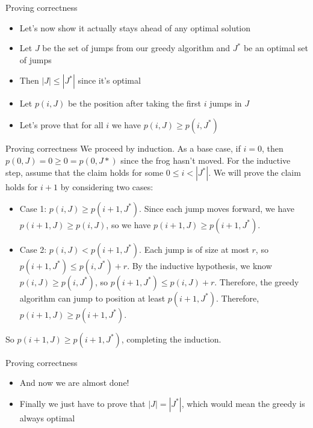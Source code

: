 \documentclass{beamer}
\begin{document}
\begin{frame}[plain]{Proving correctness}
    \begin{itemize}
        \item Let's now show it actually stays ahead of any optimal solution
        \item Let $J$ be the set of jumps from our greedy algorithm and $J^*$ be an optimal set of jumps
        \item Then $|J| \leq |J^*|$ since it's optimal
        \item Let $p(i, J)$ be the position after taking the first $i$ jumps in $J$
        \item Let's prove that for all $i$ we have $p(i, J) \geq p(i, J^*)$
    \end{itemize}
\end{frame}

\begin{frame}[plain]{Proving correctness}
We proceed by induction. 
As a base case, if $i = 0$, then
$p(0, J) = 0 \geq 0 = p(0, J*)$ since the frog hasn't moved.
For the inductive step, assume that the claim holds
for some $0 \leq i < | J^*|$. We will prove the claim holds
for $i + 1$ by considering two cases:
\begin{itemize}
\item Case 1: $p(i, J) \geq p(i + 1, J^*)$. Since each jump moves forward, 
we have $p(i + 1, J) \geq p(i, J)$, so we have $p(i + 1, J) \geq p(i + 1, J^*)$.
\item Case 2: $p(i, J) < p(i + 1, J^*)$. Each jump is of size at most $r$, 
so $p(i + 1, J^*) \leq p(i, J^*) + r$. By the inductive hypothesis, we
know $p(i, J) \geq p(i, J^*)$, so $p(i + 1, J^*) \leq p(i, J) + r$. Therefore, 
the greedy algorithm can jump to position at least $p(i + 1, J^*)$. Therefore,
$p(i + 1, J) \geq p(i + 1, J^*)$.
\end{itemize}
So $p(i + 1, J) \geq p(i + 1, J^*)$, completing the induction.
\end{frame}

\begin{frame}[plain]{Proving correctness}
    \begin{itemize}
        \item And now we are almost done!
        \item Finally we just have to prove that $|J| = |J^*|$, which would mean the greedy is always optimal
    \end{itemize}
\end{frame}
\end{document}
